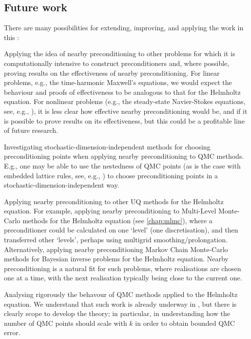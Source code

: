\subsection{Future work}\label{sec:nbpcfuture}
There are many possibilities for extending, improving, and applying the work in this :
\bit
\item Applying the idea of nearby preconditioning to other problems for which it is computationally intensive to construct preconditioners and, where possible, proving results on the effectiveness of nearby preconditioning. For linear problems, e.g., the time-harmonic Maxwell's equations, we would expect the behaviour and proofs of effectiveness to be analogous to that for the Helmholtz equation. For nonlinear problems (e.g., the steady-state Navier-Stokes equations, see, e.g., \cite{PoSi:12}), it is less clear how effective nearby preconditioning would be, and if it is possible to prove results on its effectiveness, but this could be a profitable line of future research.
\item Investigating stochastic-dimension-independent methods for choosing preconditioning points when applying nearby preconditioning to QMC methods. E.g., one may be able to use the nestedness of QMC points (as is the case with embedded lattice rules, see, e.g., \cite[Property 3, p.2169]{CoKuNu:06}) to choose preconditioning points in a stochastic-dimension-independent way.
\item Applying nearby preconditioning to other UQ methods for the Helmholtz equation. For example, applying nearby preconditioning to Multi-Level Monte-Carlo methods for the Helmholtz equation (see \cref{chap:mlmc}), where a preconditioner could be calculated on one `level' (one discretisation), and then transferred other `levels', perhaps using multigrid smoothing/prolongation. Alternatively, applying nearby preconditioning Markov Chain Monte-Carlo methods for Bayesian inverse problems for the Helmholtz equation. Nearby preconditioning is a natural fit for such problems, where realisations are chosen one at a time, with the next realisation typically being close to the current one.
  \item Analysing rigorously the behavour of QMC methods applied to the Helmholtz equation. We understand that such work is already underway in \cite{GaKuSl}, but there is clearly scope to develop the theory; in particular, in understanding how the number of QMC points should scale with $k$ in order to obtain bounded QMC error.
\eit

